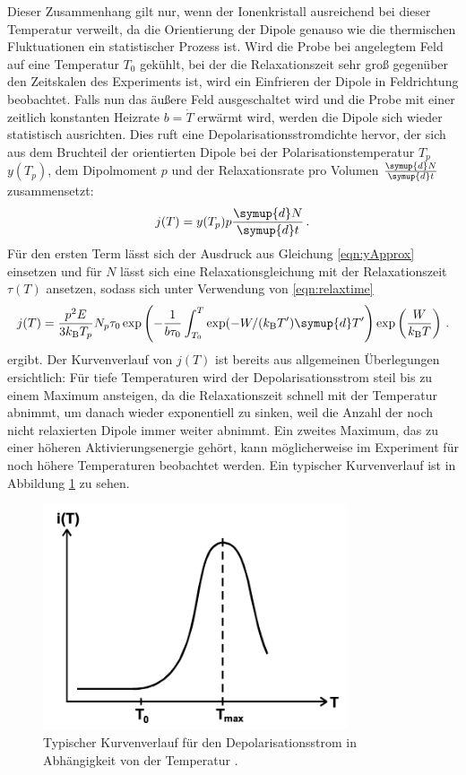 Dieser Zusammenhang gilt nur, wenn der Ionenkristall ausreichend bei dieser Temperatur verweilt, da die Orientierung der Dipole genauso wie die thermischen Fluktuationen ein statistischer Prozess ist. Wird die Probe bei angelegtem Feld auf eine Temperatur  $T_0$ gekühlt, bei der die Relaxationszeit sehr groß gegenüber den Zeitskalen des Experiments ist, wird ein Einfrieren der Dipole in Feldrichtung beobachtet. Falls nun das äußere Feld ausgeschaltet wird und die Probe mit einer zeitlich konstanten Heizrate $b=\dot{T}$ erwärmt wird, werden die Dipole sich wieder statistisch ausrichten. Dies ruft eine Depolarisationsstromdichte hervor, der sich aus dem Bruchteil der orientierten Dipole bei der Polarisationstemperatur $T_p$ $y(T_p)$, dem Dipolmoment $p$ und der Relaxationsrate pro Volumen $\frac{\symup{d}N}{\symup{d}t}$ zusammensetzt:
\begin{equation}
  j(T) = y(T_p) p \frac{\symup{d}N}{\symup{d}t}\,.
  \label{eqn:jAnsatz}
\end{equation}
Für den ersten Term lässt sich der Ausdruck aus Gleichung \eqref{eqn:yApprox} einsetzen und für $N$ lässt sich eine Relaxationsgleichung mit der Relaxationszeit $\tau(T)$ ansetzen, sodass sich unter Verwendung von \eqref{eqn:relaxtime}
\begin{equation}
  j(T) = \frac{p^2 E}{3 k_\text{B} T_p} {N_p}{\tau_0}
         \exp \left(- \frac{1}{b \tau_0} \int_{T_0}^{T} \exp(-W/(k_\text{B}T') \symup{d}T' \right) \exp\left(\frac{W}{k_{\text{B}}T}\right)\,.
  \label{eqn:depolKurve}
\end{equation}
ergibt. Der Kurvenverlauf von $j(T)$ ist bereits aus allgemeinen Überlegungen ersichtlich: Für tiefe Temperaturen wird der Depolarisationsstrom steil bis zu einem Maximum ansteigen, da die Relaxationszeit schnell mit der Temperatur abnimmt, um danach wieder exponentiell zu sinken, weil die Anzahl der noch nicht relaxierten Dipole immer weiter abnimmt. Ein zweites Maximum, das zu einer höheren Aktivierungsenergie gehört, kann möglicherweise im Experiment für noch höhere Temperaturen beobachtet werden. Ein typischer
Kurvenverlauf ist in Abbildung \ref{fig:kurve} zu sehen.

\begin{figure}
  \centering
  \includegraphics[width=0.8\textwidth]{data/kurve.png}
  \caption{Typischer Kurvenverlauf für den Depolarisationsstrom in Abhängigkeit von der Temperatur \cite{anleitungalt}.}
  \label{fig:kurve}
\end{figure}

